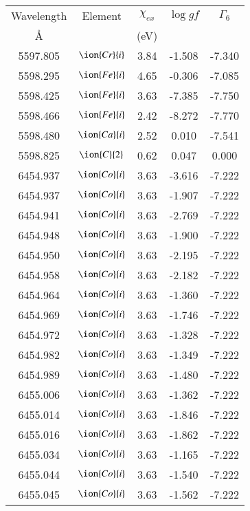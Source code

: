 \documentclass[fleqn,usenatbib]{mnras}
\begin{document}
\begin{center}
 \begin{table}
 \begin{tabular}{ccccc}
 \hline
 Wavelength & Element & $\chi_{ex}$ &  $\log gf$ & $\varGamma_{6}$ \\
   \AA{}    &         &  (eV)       &            &                  \\
 \hline
5597.805 &  $\ion{Cr}{i}$  & 3.84 & -1.508 & -7.340 \\ 
5598.295 &  $\ion{Fe}{i}$  & 4.65 & -0.306 & -7.085 \\ 
5598.425 &  $\ion{Fe}{i}$  & 3.63 & -7.385 & -7.750 \\ 
5598.466 &  $\ion{Fe}{i}$  & 2.42 & -8.272 & -7.770 \\ 
5598.480 &  $\ion{Ca}{i}$  & 2.52 & 0.010 & -7.541 \\ 
5598.825 &  $\ion{C}{2}$ & 0.62 & 0.047 & 0.000 \\ 
6454.937 &  $\ion{Co}{i}$  & 3.63 & -3.616 & -7.222 \\ 
6454.937 &  $\ion{Co}{i}$  & 3.63 & -1.907 & -7.222 \\ 
6454.941 &  $\ion{Co}{i}$  & 3.63 & -2.769 & -7.222 \\ 
6454.948 &  $\ion{Co}{i}$  & 3.63 & -1.900 & -7.222 \\ 
6454.950 &  $\ion{Co}{i}$  & 3.63 & -2.195 & -7.222 \\ 
6454.958 &  $\ion{Co}{i}$  & 3.63 & -2.182 & -7.222 \\ 
6454.964 &  $\ion{Co}{i}$  & 3.63 & -1.360 & -7.222 \\ 
6454.969 &  $\ion{Co}{i}$  & 3.63 & -1.746 & -7.222 \\ 
6454.972 &  $\ion{Co}{i}$  & 3.63 & -1.328 & -7.222 \\ 
6454.982 &  $\ion{Co}{i}$  & 3.63 & -1.349 & -7.222 \\ 
6454.989 &  $\ion{Co}{i}$  & 3.63 & -1.480 & -7.222 \\ 
6455.006 &  $\ion{Co}{i}$  & 3.63 & -1.362 & -7.222 \\ 
6455.014 &  $\ion{Co}{i}$  & 3.63 & -1.846 & -7.222 \\ 
6455.016 &  $\ion{Co}{i}$  & 3.63 & -1.862 & -7.222 \\ 
6455.034 &  $\ion{Co}{i}$  & 3.63 & -1.165 & -7.222 \\ 
6455.044 &  $\ion{Co}{i}$  & 3.63 & -1.540 & -7.222 \\ 
6455.045 &  $\ion{Co}{i}$  & 3.63 & -1.562 & -7.222 \\ 

\end{tabular}
\end{table}
\end{center}
\end{document}
